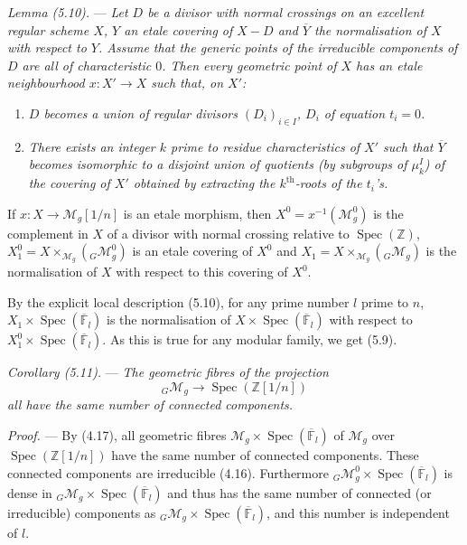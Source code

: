 \documentclass[10pt]{article}
\newcommand{\Spec}{\operatorname{Spec}}
\begin{document}
\medskip
\noindent\emph{Lemma (5.10).} --- \emph{Let $D$ be a divisor with normal crossings on an excellent regular scheme $X$, $Y$ an etale covering of $X-D$ and $\overline Y$ the normalisation of $X$ with respect to $Y$. Assume that the generic points of the irreducible components of $D$ are all of characteristic $0$. Then every geometric point of $X$ has an etale neighbourhood $x:X'\to X$ such that, on $X'$:}
\begin{enumerate}[label=(\roman*)]
\item \emph{$D$ becomes a union of regular divisors $(D_i)_{i\in I}$, $D_i$ of equation $t_i=0$.}
\item \emph{There exists an integer $k$ prime to residue characteristics of $X'$ such that $\overline Y$ becomes isomorphic to a disjoint union of quotients (by subgroups of $\mu_k^I$) of the covering of $X'$ obtained by extracting the $k^{\mathrm{th}}$-roots of the $t_i$'s.}
\end{enumerate}

If $x:X\to\mathcal M_g[1/n]$ is an etale morphism, then $X^0=x^{-1}(\mathcal M_g^0)$ is the complement in $X$ of a divisor with normal crossing relative to $\Spec(\mathbb Z)$, $X_1^0=X\times_{\mathcal M_g}({}_G\mathcal M_g^0)$ is an etale covering of $X^0$ and $X_1=X\times_{\mathcal M_g}({}_G\mathcal M_g)$ is the normalisation of $X$ with respect to this covering of $X^0$.

By the explicit local description (5.10), for any prime number $l$ prime to $n$, $X_1\times\Spec(\overline{\mathbb F}_l)$ is the normalisation of $X\times\Spec(\overline{\mathbb F}_l)$ with respect to $X_1^0\times\Spec(\overline{\mathbb F}_l)$. As this is true for any modular family, we get (5.9).

\medskip
\noindent\emph{Corollary (5.11).} --- \emph{The geometric fibres of the projection}
\[
{}_G\mathcal M_g\longrightarrow \Spec(\mathbb Z[1/n])
\]
\emph{all have the same number of connected components.}

\noindent\emph{Proof.} --- By (4.17), all geometric fibres $\mathcal M_g\times\Spec(\overline{\mathbb F}_l)$ of $\mathcal M_g$ over $\Spec(\mathbb Z[1/n])$ have the same number of connected components. These connected components are irreducible (4.16). Furthermore ${}_G\mathcal M_g^0\times\Spec(\overline{\mathbb F}_l)$ is dense in ${}_G\mathcal M_g\times\Spec(\overline{\mathbb F}_l)$ and thus has the same number of connected (or irreducible) components as ${}_G\mathcal M_g\times\Spec(\overline{\mathbb F}_l)$, and this number is independent of $l$.
\end{document}
